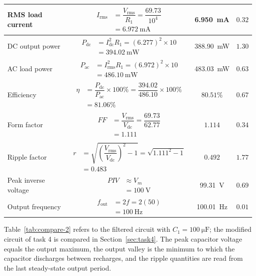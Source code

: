 \documentclass[12pt,a4paper]{article}
\begin{document}
\begin{table}[H]
\begin{tabular}{|>{\raggedright\arraybackslash}p{2.7cm}|c|c|c|}
			\hline
			RMS load current & $\begin{aligned}I_{\mathrm{rms}} &= \dfrac{V_{\mathrm{rms}}}{R_1} = \dfrac{69.73}{10^{4}} \\ &= \SI{6.972}{\milli\ampere}\end{aligned}$ & \SI{6.950}{\milli\ampere} & $0.32$ \\
			\hline
			DC output power & $\begin{aligned}P_{\mathrm{dc}} &= I_{\mathrm{dc}}^{2}R_1 = (6.277)^2\times10 \\ &= \SI{394.02}{\milli\watt}\end{aligned}$ & \SI{388.90}{\milli\watt} & $1.30$ \\
			\hline
			AC load power & $\begin{aligned}P_{\mathrm{ac}} &= I_{\mathrm{rms}}^{2}R_1 = (6.972)^2\times10 \\ &= \SI{486.10}{\milli\watt}\end{aligned}$ & \SI{483.03}{\milli\watt} & $0.63$ \\
			\hline
			Efficiency & $\begin{aligned}\eta &= \dfrac{P_{\mathrm{dc}}}{P_{\mathrm{ac}}}\times100\% = \dfrac{394.02}{486.10}\times100\% \\ &= 81.06\%\end{aligned}$ & $80.51\%$ & $0.67$ \\
			\hline
			Form factor & $\begin{aligned}FF &= \dfrac{V_{\mathrm{rms}}}{V_{\mathrm{dc}}} = \dfrac{69.73}{62.77} \\ &= 1.111\end{aligned}$ & $1.114$ & $0.34$ \\
			\hline
			Ripple factor & $\begin{aligned}r &= \sqrt{\left(\dfrac{V_{\mathrm{rms}}}{V_{\mathrm{dc}}}\right)^{2}-1} = \sqrt{1.111^{2}-1} \\ &= 0.483\end{aligned}$ & $0.492$ & $1.77$ \\
			\hline
			Peak inverse voltage & $\begin{aligned}PIV &\approx V_m \\ &= \SI{100}{\volt}\end{aligned}$ & \SI{99.31}{\volt} & $0.69$ \\
			\hline
			Output frequency & $\begin{aligned}f_{\mathrm{out}} &= 2f = 2(50) \\ &= \SI{100}{\hertz}\end{aligned}$ & \SI{100.01}{\hertz} & $0.01$ \\
			\hline
		\end{tabular}
	\end{table}
	\newpage
	Table~\ref{tab:compare-2} refers to the filtered circuit with $C_1 = \SI{100}{\micro\farad}$; the modified circuit of task 4 is compared in Section~\ref{sec:task4}. The peak capacitor voltage equals the output maximum, the output valley is the minimum to which the capacitor discharges between recharges, and the ripple quantities are read from the last steady-state output period.
	
\end{document}
